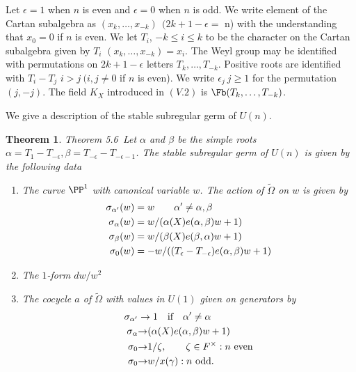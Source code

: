 \documentclass{memo-l}
\newtheorem{theorem}{Theorem}[section]
\theoremstyle{definition}
\theoremstyle{remark}
\numberwithin{section}{chapter}
\numberwithin{equation}{chapter}
\begin{document}
   Let ${\epsilon}  =  1$ when $n$ is even and ${\epsilon}  =  0$ when $n$ is
odd.  We write element of the Cartan subalgebra as $(x_{k},\ldots ,x_{-k})
\ \ (2k+1-{\epsilon}  = $ n) with the understanding that $x_{0}  =  0$ if $n$ is
even.  We let $T_{i}$, $-k  \le i  \le k$ to be the character on the
Cartan subalgebra given by $T_{i}$ $(x_{k},\ldots ,x_{-k})  =  x_{i}$.  The Weyl
group may be identified with permutations on $2k+1-{\epsilon}$ letters
$T_{k},\ldots ,T_{-k}$.  Positive roots are identified with $T_{i}-T_{j}$
 $i > j\  (i,j  \ne  0$ if $n$ is even).  We write ${\epsilon}_{j}\
 j \ge  1$ for
the permutation $(j,-j)$.  The field $K_X$ introduced in $(V.2)$ is $\Fb
(T_{k},\ldots ,T_{-k})$.

   We give a description of the stable subregular germ of $U(n)$.

\setcounter{theorem}{5} %

\begin{theorem}{Theorem 5.6}\ Let ${\alpha}$ and ${\beta}$ be the simple
roots ${\alpha}  =  T_{1}-T_{-{\epsilon}}, {\beta}  =
T_{-{\epsilon}}-T_{-{\epsilon}-1}$.  The stable subregular germ of $U(n)$
is given by the following data
	\begin{enumerate}[label=\arabic*.]
\item The curve ${\PP}^1$ with canonical variable $w$.  The
action of $\tilde{\Omega}$ on $w$ is given by
$$
\aligned
{\sigma}_{{\alpha}'}(w)  &=  w \qquad {\alpha}' \ne  {\alpha},{\beta} \\
{\sigma}_{{\alpha}}(w)  &=  w/({\alpha}(X)e({\alpha},{\beta})w + 1) \\
{\sigma}_{{\beta}}(w)  &=  w/({\beta}(X)e({\beta},{\alpha})w + 1) \\
{\sigma}_{0}(w)  &=
-w/((T_{{\epsilon}}-T_{-{\epsilon}})e({\alpha},{\beta})w + 1)
\endaligned
$$
\item The $1$-form $dw/w^{2}$
\item The cocycle $a$ of $\tilde{\Omega}$ with values in $U(1)$ given on
generators by
$$
\aligned
\sigma_{\alpha'} &\to 1 \quad \hbox{if}\quad \alpha'\ne\alpha\\
{\sigma}_{{\alpha}} &{\to} ({\alpha}(X)e({\alpha},{\beta})w + 1)\\
{\sigma}_{0} &{\to} 1/{\zeta}, \qquad {\zeta}  \in  F^{\times} : n\ {\text{even}}\\
{\sigma}_{0} &{\to} w/x({\gamma}) : n\ {\text{odd}}.
\endaligned
$$
\end{enumerate}
\end{theorem}
\end{document}

